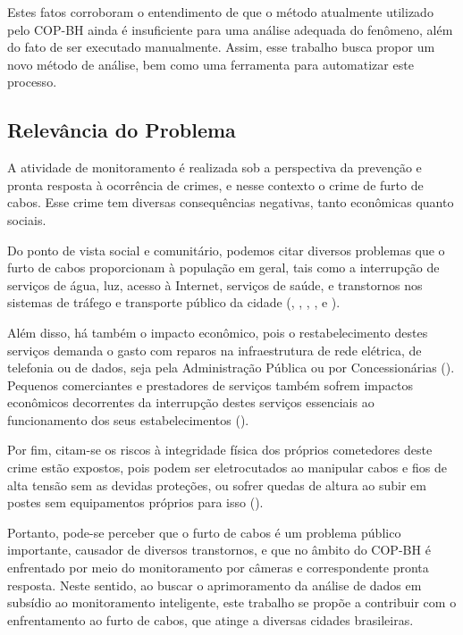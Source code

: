 Estes fatos corroboram o entendimento de que o método atualmente utilizado pelo COP-BH ainda é insuficiente para uma análise adequada do fenômeno, além do fato de ser executado manualmente. Assim, esse trabalho busca propor um novo método de análise, bem como uma ferramenta para automatizar este processo.

\subsection{Relevância do Problema}

A atividade de monitoramento é realizada sob a perspectiva da prevenção e pronta resposta à ocorrência de crimes, e nesse contexto o crime de furto de cabos. Esse crime tem diversas consequências negativas, tanto econômicas quanto sociais.

Do ponto de vista social e comunitário, podemos citar diversos problemas que o furto de cabos proporcionam à população em geral, tais como a interrupção de serviços de água, luz, acesso à Internet, serviços de saúde, e transtornos nos sistemas de tráfego e transporte público da cidade  (, , , ,  e ).

Além disso, há também o impacto econômico, pois o restabelecimento destes serviços demanda o gasto com reparos na infraestrutura de rede elétrica, de telefonia ou de dados, seja pela Administração Pública ou por Concessionárias (). Pequenos comerciantes e prestadores de serviços também sofrem impactos econômicos decorrentes da interrupção destes serviços essenciais ao funcionamento dos seus estabelecimentos ().

Por fim, citam-se os riscos à integridade física dos próprios cometedores deste crime estão expostos, pois podem ser eletrocutados ao manipular cabos e fios de alta tensão sem as devidas proteções, ou sofrer quedas de altura ao subir em postes sem equipamentos próprios para isso ().

Portanto, pode-se perceber que o furto de cabos é um problema público importante, causador de diversos transtornos, e que no âmbito do COP-BH é enfrentado por meio do monitoramento por câmeras e correspondente pronta resposta. Neste sentido, ao buscar o aprimoramento da análise de dados em subsídio ao monitoramento inteligente, este trabalho se propõe a contribuir com o enfrentamento ao furto de cabos, que atinge a diversas cidades brasileiras.

